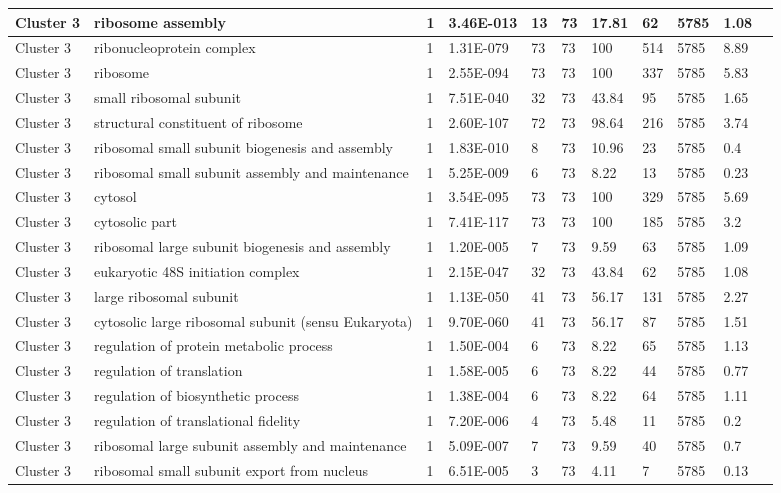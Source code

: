 \begin{tabular}{|l|l|l|l|l|l|l|l|l|l|l|}
\hline
Cluster 3&ribosome assembly&1&3.46E-013&13&73&17.81&62&5785&1.08&\\
\hline
Cluster 3&ribonucleoprotein complex&1&1.31E-079&73&73&100&514&5785&8.89&\\
\hline
Cluster 3&ribosome&1&2.55E-094&73&73&100&337&5785&5.83&\\
\hline
Cluster 3&small ribosomal subunit&1&7.51E-040&32&73&43.84&95&5785&1.65&\\
\hline
Cluster 3&structural constituent of ribosome&1&2.60E-107&72&73&98.64&216&5785&3.74&\\
\hline
Cluster 3&ribosomal small subunit biogenesis and assembly&1&1.83E-010&8&73&10.96&23&5785&0.4&\\
\hline
Cluster 3&ribosomal small subunit assembly and maintenance&1&5.25E-009&6&73&8.22&13&5785&0.23&\\
\hline
Cluster 3&cytosol&1&3.54E-095&73&73&100&329&5785&5.69&\\
\hline
Cluster 3&cytosolic part&1&7.41E-117&73&73&100&185&5785&3.2&\\
\hline
Cluster 3&ribosomal large subunit biogenesis and assembly&1&1.20E-005&7&73&9.59&63&5785&1.09&\\
\hline
Cluster 3&eukaryotic 48S initiation complex&1&2.15E-047&32&73&43.84&62&5785&1.08&\\
\hline
Cluster 3&large ribosomal subunit&1&1.13E-050&41&73&56.17&131&5785&2.27&\\
\hline
Cluster 3&cytosolic large ribosomal subunit (sensu Eukaryota)&1&9.70E-060&41&73&56.17&87&5785&1.51&\\
\hline
Cluster 3&regulation of protein metabolic process&1&1.50E-004&6&73&8.22&65&5785&1.13&\\
\hline
Cluster 3&regulation of translation&1&1.58E-005&6&73&8.22&44&5785&0.77&\\
\hline
Cluster 3&regulation of biosynthetic process&1&1.38E-004&6&73&8.22&64&5785&1.11&\\
\hline
Cluster 3&regulation of translational fidelity&1&7.20E-006&4&73&5.48&11&5785&0.2&\\
\hline
Cluster 3&ribosomal large subunit assembly and maintenance&1&5.09E-007&7&73&9.59&40&5785&0.7&\\
\hline
Cluster 3&ribosomal small subunit export from nucleus&1&6.51E-005&3&73&4.11&7&5785&0.13&\\
\hline
\end{tabular}
